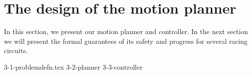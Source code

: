 \section{The design of the motion planner}
In this section, we present our motion planner and controller.
%
In the next section we will present the formal guarantees of its safety and progress for several racing circuits.

{3-1-problemdefn.tex}
{3-2-planner}
{3-3-controller}
